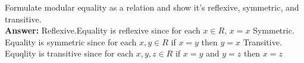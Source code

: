 \documentclass[12pt]{article}
\begin{document}
Formulate modular equality as a relation and show it's reflexive, symmetric, and transitive.\\

{\noindent\bf Answer:}
{
  \newline
Reflexive.Equality is reflexive since for each $x \in R$, $x=x$\newline
 \newline
Symmetric. Equality is symmetric since for each $x,y \in R$ if $x=y$ then $y=x$\newline
 \newline
Transitive. Equqlity is transitive since for each $x,y,z \in R$ if $x=y$ and $y=z$ then $x=z$\newline
}
\end{document}
